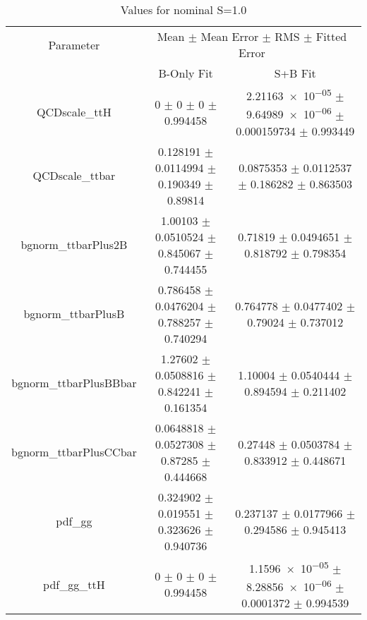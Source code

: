 \begin{table}
\centering
\caption{Values for nominal S=1.0}
\begin{tabular}{ccc}
\toprule
Parameter & \multicolumn{2}{c}{Mean $\pm$ Mean Error $\pm$ RMS $\pm$ Fitted Error}\\
 & B-Only Fit & S+B Fit\\
\midrule
QCDscale\_ttH & \num{0} $\pm$ \num{0} $\pm$ \num{0} $\pm$ \num{0.994458} & \num{2.21163e-05} $\pm$ \num{9.64989e-06} $\pm$ \num{0.000159734} $\pm$ \num{0.993449}\\
QCDscale\_ttbar & \num{0.128191} $\pm$ \num{0.0114994} $\pm$ \num{0.190349} $\pm$ \num{0.89814} & \num{0.0875353} $\pm$ \num{0.0112537} $\pm$ \num{0.186282} $\pm$ \num{0.863503}\\
bgnorm\_ttbarPlus2B & \num{1.00103} $\pm$ \num{0.0510524} $\pm$ \num{0.845067} $\pm$ \num{0.744455} & \num{0.71819} $\pm$ \num{0.0494651} $\pm$ \num{0.818792} $\pm$ \num{0.798354}\\
bgnorm\_ttbarPlusB & \num{0.786458} $\pm$ \num{0.0476204} $\pm$ \num{0.788257} $\pm$ \num{0.740294} & \num{0.764778} $\pm$ \num{0.0477402} $\pm$ \num{0.79024} $\pm$ \num{0.737012}\\
bgnorm\_ttbarPlusBBbar & \num{1.27602} $\pm$ \num{0.0508816} $\pm$ \num{0.842241} $\pm$ \num{0.161354} & \num{1.10004} $\pm$ \num{0.0540444} $\pm$ \num{0.894594} $\pm$ \num{0.211402}\\
bgnorm\_ttbarPlusCCbar & \num{0.0648818} $\pm$ \num{0.0527308} $\pm$ \num{0.87285} $\pm$ \num{0.444668} & \num{0.27448} $\pm$ \num{0.0503784} $\pm$ \num{0.833912} $\pm$ \num{0.448671}\\
pdf\_gg & \num{0.324902} $\pm$ \num{0.019551} $\pm$ \num{0.323626} $\pm$ \num{0.940736} & \num{0.237137} $\pm$ \num{0.0177966} $\pm$ \num{0.294586} $\pm$ \num{0.945413}\\
pdf\_gg\_ttH & \num{0} $\pm$ \num{0} $\pm$ \num{0} $\pm$ \num{0.994458} & \num{1.1596e-05} $\pm$ \num{8.28856e-06} $\pm$ \num{0.0001372} $\pm$ \num{0.994539}\\
\bottomrule
\end{tabular}
\end{table}